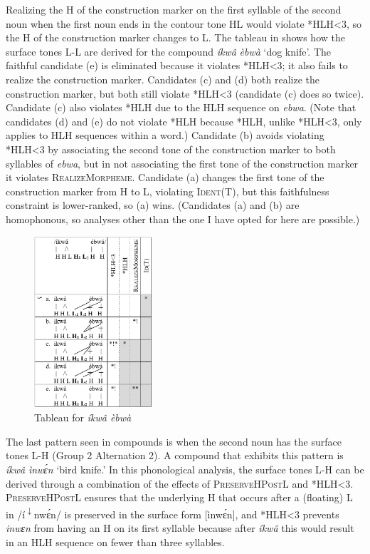 \documentclass[output=paper]{langscibook}
\begin{document}
Realizing the H of the construction marker on the first syllable of the second noun when the first noun ends in the contour tone HL would violate *HLH<3, so the H of the construction marker changes to L. The tableau in  shows how the surface tones L-L are derived for the compound \textit{íkwâ} \textit{èbwà} ‘dog knife’.
The faithful candidate (e) is eliminated because it violates *HLH<3; it also fails to realize the construction marker. Candidates (c) and (d) both realize the construction marker, but both still violate *HLH<3 (candidate (c) does so twice). Candidate (c) also violates *HLH due to the HLH sequence on \textit{ebwa}. (Note that candidates (d) and (e) do not violate *HLH because *HLH, unlike *HLH<3, only applies to HLH sequences within a word.) Candidate (b) avoids violating *HLH<3 by associating the second tone of the construction marker to both syllables of \textit{ebwa}, but in not associating the first tone of the construction marker it violates \textsc{RealizeMorpheme}. Candidate (a) changes the first tone of the construction marker from H to L, violating \textsc{Ident(T)}, but this faithfulness constraint is lower-ranked, so (a) wins. (Candidates (a) and (b) are homophonous, so analyses other than the one I have opted for here are possible.)   
  
\begin{figure}
\includegraphics[width=44mm]{figures/glewwe-img8.png}
\caption{Tableau for \textit{íkwâ èbwà}\label{fig:glewwe:9}}
\end{figure}

The last pattern seen in compounds is when the second noun has the surface tones L-H (Group 2 Alternation 2). A compound that exhibits this pattern is \textit{íkwâ} \textit{ìnwɛ́n} ‘bird knife.’ In this phonological analysis, the surface tones L-H can be derived through a combination of the effects of \textsc{PreserveHPostL} and *HLH<3. \textsc{PreserveHPostL} ensures that the underlying H that occurs after a (floating) L in /í\textsuperscript{$\downarrow$}nwɛ́n/ is preserved in the surface form [ìnwɛ́n], and *HLH<3 prevents \textit{inwɛn} from having an H on its first syllable because after \textit{íkwâ} this would result in an HLH sequence on fewer than three syllables.
\end{document}
